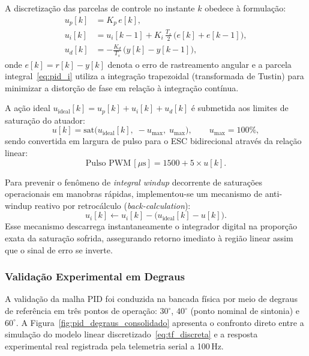 A discretização das parcelas de controle no instante $k$ obedece à formulação:
\begin{align}
    u_p[k] &= K_p\, e[k], \label{eq:pid_p} \\
    u_i[k] &= u_i[k-1] + K_i\,\frac{T_s}{2}\,\bigl(e[k] + e[k-1]\bigr), \label{eq:pid_i} \\
    u_d[k] &= -\frac{K_d}{T_s}\,\bigl(y[k] - y[k-1]\bigr), \label{eq:pid_d}
\end{align}
\noindent onde $e[k] = r[k] - y[k]$ denota o erro de rastreamento angular e a parcela integral~\eqref{eq:pid_i} utiliza a integração trapezoidal (transformada de Tustin) para minimizar a distorção de fase em relação à integração contínua.

A ação ideal $u_{\text{ideal}}[k] = u_p[k] + u_i[k] + u_d[k]$ é submetida aos limites de saturação do atuador:
\begin{equation}
    u[k] = \text{sat}\bigl(u_{\text{ideal}}[k],\; -u_{\max},\; u_{\max}\bigr), \qquad u_{\max} = 100\%,
\end{equation}
\noindent sendo convertida em largura de pulso para o ESC bidirecional através da relação linear:
\begin{equation}
    \text{Pulso PWM}\,[\mu\text{s}] = 1500 + 5 \times u[k].
\end{equation}

Para prevenir o fenômeno de \textit{integral windup} decorrente de saturações operacionais em manobras rápidas, implementou-se um mecanismo de anti-windup reativo por retrocálculo (\textit{back-calculation}):
\begin{equation}
    u_i[k] \leftarrow u_i[k] - \bigl(u_{\text{ideal}}[k] - u[k]\bigr).
    \label{eq:anti_windup}
\end{equation}
Esse mecanismo descarrega instantaneamente o integrador digital na proporção exata da saturação sofrida, assegurando retorno imediato à região linear assim que o sinal de erro se inverte.

\subsubsection{Validação Experimental em Degraus}

A validação da malha PID foi conduzida na bancada física por meio de degraus de referência em três pontos de operação: $30^\circ$, $40^\circ$ (ponto nominal de sintonia) e $60^\circ$. A Figura~\ref{fig:pid_degraus_consolidado} apresenta o confronto direto entre a simulação do modelo linear discretizado~\eqref{eq:tf_discreta} e a resposta experimental real registrada pela telemetria serial a 100\,Hz.

